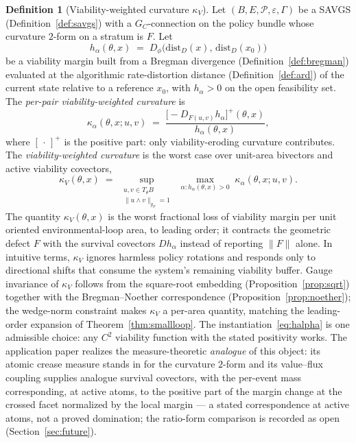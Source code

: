 \documentclass[11pt,a4paper]{article}
\theoremstyle{plain}
\theoremstyle{definition}
\newtheorem{definition}[theorem]{Definition}
\theoremstyle{remark}
\newcommand{\kk}{\kappa_{\!V}}
\newcommand{\distD}{\mathrm{dist}_{D}}
\begin{document}
\begin{definition}[Viability-weighted curvature $\kk$]
\label{def:kv}
Let $(B, E, \mathcal P, \varepsilon, \Gamma)$ be a SAVGS
(Definition~\ref{def:savgs}) with a $G_C$-connection on the policy
bundle whose curvature $2$-form on a stratum is $F$. Let
\begin{equation}\label{eq:halpha}
  h_\alpha(\theta, x) \;=\; D_\phi\bigl(\distD(x),\, \distD(x_0)\bigr)
\end{equation}
be a viability margin built from a Bregman divergence
(Definition~\ref{def:bregman}) evaluated at the algorithmic
rate-distortion distance (Definition~\ref{def:ard}) of the current
state relative to a reference $x_0$, with $h_\alpha > 0$ on the open
feasibility set. The \emph{per-pair viability-weighted curvature} is
\begin{equation}\label{eq:kv-pair}
  \kappa_\alpha(\theta, x; u, v) \;=\;
  \frac{\bigl[-D_{F(u,v)}h_\alpha\bigr]^+(\theta, x)}
       {h_\alpha(\theta, x)},
\end{equation}
where $[\,\cdot\,]^+$ is the positive part: only viability-eroding
curvature contributes. The \emph{viability-weighted curvature} is the
worst case over unit-area bivectors and active viability covectors,
\begin{equation}\label{eq:kv}
  \kk(\theta, x) \;=\; \sup_{\substack{u, v \in T_\theta B \\
  \|u \wedge v\|_{g_F} = 1}}\;
  \max_{\alpha : h_\alpha(\theta, x) > 0}\;
  \kappa_\alpha(\theta, x; u, v).
\end{equation}
The quantity $\kk(\theta, x)$ is the worst fractional loss of
viability margin per unit oriented environmental-loop area, to
leading order; it contracts the geometric defect $F$ with the
survival covectors $D h_\alpha$ instead of reporting $\|F\|$ alone.
In intuitive terms, $\kk$ ignores harmless policy rotations and
responds only to directional shifts that consume the system's
remaining viability buffer.
Gauge invariance of $\kk$ follows from the square-root embedding
(Proposition~\ref{prop:sqrt}) together with the Bregman--Noether
correspondence (Proposition~\ref{prop:noether}); the wedge-norm
constraint makes $\kk$ a per-area quantity, matching the
leading-order expansion of Theorem~\ref{thm:smallloop}. The
instantiation~\eqref{eq:halpha} is one admissible choice: any $C^2$
viability function with the stated positivity works. The
application paper \citep{zai2026measure} realizes the
measure-theoretic \emph{analogue} of this object: its atomic crease
measure stands in for the curvature $2$-form and its value--flux
coupling supplies analogue survival covectors, with the per-event
mass corresponding, at active atoms, to the positive part of the
margin change at the crossed facet normalized by the local margin
--- a stated correspondence at active atoms, not a proved
domination; the ratio-form comparison is recorded as open
(Section~\ref{sec:future}).
\end{definition}
\end{document}
